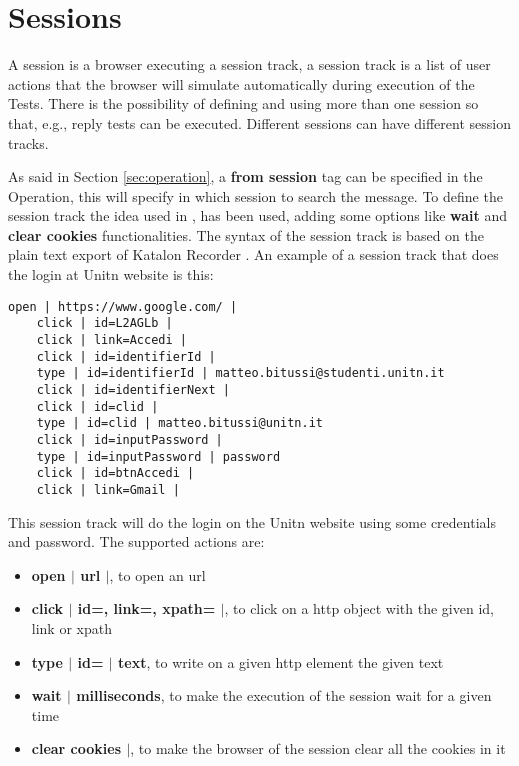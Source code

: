 \section{Sessions}
A session is a browser executing a \gls{session track}, a \gls{session track} is a list of user actions that the browser will simulate automatically during execution of the Tests. There is the possibility of defining and using more than one session so that, e.g., reply tests can be executed. Different sessions can have different session tracks.

As said in Section \ref{sec:operation}, a \textbf{from session} tag can be specified in the Operation, this will specify in which session to search the message. To define the \gls{session track} the idea used in \cite{claudio_grisenti,stefano_facchini}, has been used, adding some options like \textbf{wait} and \textbf{clear cookies} functionalities.
The syntax of the \gls{session track} is based on the plain text export of Katalon Recorder \cite{katalon_recorder_syntax}. 
An example of a \gls{session track} that does the login at Unitn website is this:

\begin{lstlisting}[caption=Session track Unitn login]
    open | https://www.google.com/ |
    click | id=L2AGLb |
    click | link=Accedi |
    click | id=identifierId |
    type | id=identifierId | matteo.bitussi@studenti.unitn.it
    click | id=identifierNext |
    click | id=clid |
    type | id=clid | matteo.bitussi@unitn.it
    click | id=inputPassword |
    type | id=inputPassword | password
    click | id=btnAccedi |
    click | link=Gmail |
\end{lstlisting}

This \gls{session track} will do the login on the Unitn website using some credentials and password. The supported actions are:
\begin{itemize}
    \item \textbf{open $|$ url $|$}, to open an url
    \item \textbf{click $|$ id=, link=, xpath= $|$}, to click on a http object with the given id, link or xpath
    \item \textbf{type $|$ id= $|$ text}, to write on a given http element the given text
    \item \textbf{wait $|$ milliseconds}, to make the execution of the session wait for a given time 
    \item \textbf{clear cookies $|$}, to make the browser of the session clear all the cookies in it
\end{itemize}




